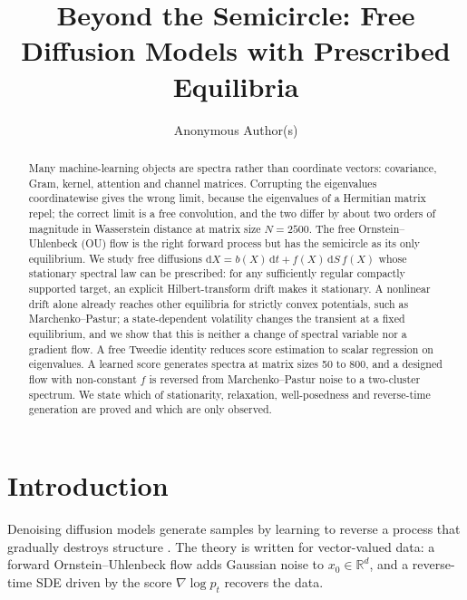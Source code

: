 \documentclass[11pt]{article}
\newcommand{\R}{\mathbb{R}}
\theoremstyle{plain}
\theoremstyle{definition}
\theoremstyle{remark}
\begin{document}
\sloppy

\title{Beyond the Semicircle: Free Diffusion Models with Prescribed Equilibria}
\author{Anonymous Author(s)}
\date{}
\maketitle

\begin{abstract}
Many machine-learning objects are spectra rather than coordinate vectors: covariance, Gram,
kernel, attention and channel matrices. Corrupting the eigenvalues coordinatewise gives the
wrong limit, because the eigenvalues of a Hermitian matrix repel; the correct limit is a free
convolution, and the two differ by about two orders of magnitude in Wasserstein distance at
matrix size $N=2500$. The free Ornstein--Uhlenbeck (OU) flow is the right forward process
but has the semicircle as its only equilibrium. We study free diffusions
$\mathrm dX=b(X)\,\mathrm dt+f(X)\,\mathrm dS\,f(X)$ whose stationary spectral law can be
prescribed: for any sufficiently regular compactly supported target, an explicit
Hilbert-transform drift makes it stationary. A nonlinear drift alone already reaches other
equilibria for strictly convex potentials, such as Marchenko--Pastur; a state-dependent
volatility changes the transient at a fixed equilibrium, and we show that this is neither a
change of spectral variable nor a gradient flow. A free Tweedie identity reduces score
estimation to scalar regression on eigenvalues. A learned score generates spectra at matrix
sizes 50 to 800, and a designed flow with non-constant $f$ is reversed from Marchenko--Pastur
noise to a two-cluster spectrum. We state which of stationarity, relaxation, well-posedness
and reverse-time generation are proved and which are only observed.
\end{abstract}

\section{Introduction}\label{sec:intro}

Denoising diffusion models generate samples by learning to reverse a process that
gradually destroys structure \citep{SohlDickstein2015, Ho2020, Song2021}. The theory is
written for vector-valued data: a forward Ornstein--Uhlenbeck flow adds Gaussian noise to
$x_0\in\R^d$, and a reverse-time SDE driven by the score $\nabla\log p_t$ recovers the data.
\end{document}
